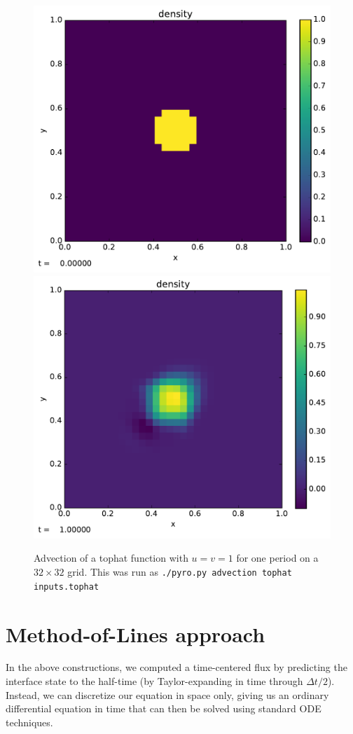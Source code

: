 \begin{figure}
\centering
\includegraphics[width=0.48\linewidth]{tophat_init}\hspace{1em}
\includegraphics[width=0.48\linewidth]{tophat_final}
\caption{\label{fig:adv:tophat-2d} Advection of a tophat function
 with $u = v = 1$ for one period on a $32\times 32$ grid.  This
was run as {\tt ./pyro.py advection tophat inputs.tophat}}
\end{figure}



\section{Method-of-Lines approach}
\label{adv:sec:mol_2d}

In the above constructions, we computed a time-centered flux by
predicting the interface state to the half-time (by Taylor-expanding
in time through $\Delta t /2$).  Instead, we can discretize our
equation in space only, giving us an ordinary differential equation
in time that can then be solved using standard ODE techniques.

